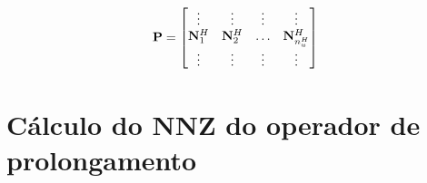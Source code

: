 \begin{equation}\label{eq:pronlogamento}
 \mathbf{P} =\begin{bmatrix}
\vdots                    & \vdots                      & \vdots & \vdots   \\ 
 \basefunctioncoarse[1]      & \basefunctioncoarse[2]         & \hdots & \basefunctioncoarse[\qtdfreedomcoarse] \\ 
\vdots                    & \vdots                      & \vdots & \vdots 
\end{bmatrix}
\end{equation}
















\section{Cálculo do NNZ do operador de prolongamento}\label{sec:complexProlong}

